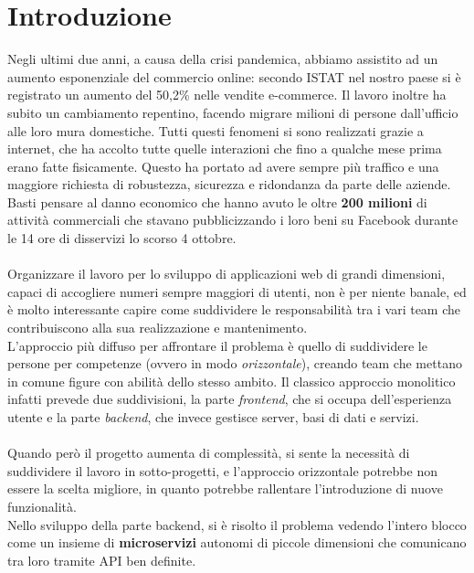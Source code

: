 \chapter{Introduzione}\label{ch:introduzione}
Negli ultimi due anni, a causa della crisi pandemica, abbiamo assistito ad un aumento 
esponenziale del commercio online:
secondo ISTAT nel nostro paese si è registrato un aumento del 50,2\% nelle vendite 
e-commerce.\cite{istat}
Il lavoro inoltre ha subito un cambiamento repentino, facendo migrare milioni di persone
 dall'ufficio alle loro mura domestiche.
Tutti questi fenomeni si sono realizzati grazie a internet, che ha accolto tutte quelle
 interazioni che fino a qualche mese prima
erano fatte fisicamente.
Questo ha portato ad avere sempre più traffico e una maggiore richiesta di robustezza, 
sicurezza e ridondanza da parte delle aziende.
Basti pensare al danno economico che hanno 
avuto le oltre \textbf{200 milioni} di attività commerciali che stavano pubblicizzando i 
loro beni su Facebook durante
le 14 ore di disservizi lo scorso 4 ottobre\cite{fbdown}.
\\\\
Organizzare il lavoro per lo sviluppo di applicazioni web di grandi dimensioni, capaci di 
accogliere numeri sempre maggiori di utenti, non è per niente banale, ed è molto interessante
capire come suddividere le responsabilità tra i vari team che contribuiscono alla sua realizzazione
 e mantenimento.
\\
L'approccio più diffuso per affrontare il problema è quello di suddividere le persone per 
competenze (ovvero in modo \emph{orizzontale}), creando team che mettano in comune
figure con abilità dello stesso ambito. Il classico approccio monolitico infatti prevede due
 suddivisioni, la parte \emph{frontend}, che si occupa dell'esperienza 
utente e la parte \emph{backend}, che invece gestisce server, basi di dati e servizi. 
\\\\
Quando però il progetto aumenta di complessità, si sente la necessità 
di suddividere il lavoro in sotto-progetti, e l'approccio orizzontale potrebbe non essere la scelta
 migliore, in quanto potrebbe rallentare l'introduzione di nuove funzionalità.
\\
Nello sviluppo della parte backend, si è risolto il problema vedendo l'intero blocco come un
insieme di \textbf{microservizi} autonomi di piccole dimensioni che comunicano tra loro tramite API ben definite.
